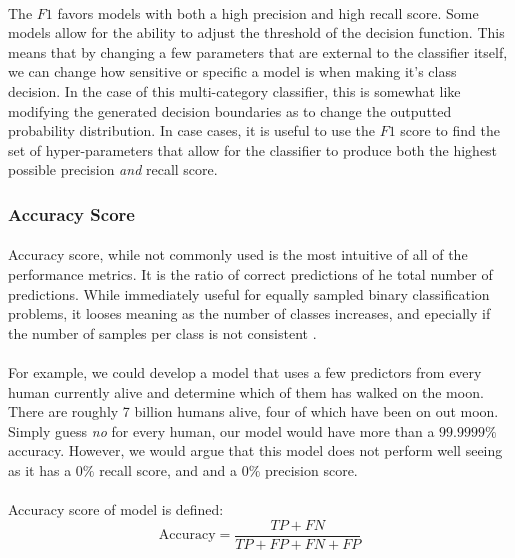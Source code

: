 \documentclass[12pt,letterpaper]{article}
\begin{document}
\paragraph*{}The $F1$ favors models with both a high precision and high recall score. Some models allow for the ability to adjust the threshold of the decision function. This means that by changing a few parameters that are external to the classifier itself, we can change how sensitive or specific a model is when making it's class decision. In the case of this multi-category classifier, this is somewhat like modifying the generated decision boundaries as to change the outputted probability distribution. In case cases, it is useful to use the $F1$ score to find the set of hyper-parameters that allow for the classifier to produce both the highest possible precision \textit{and} recall score.


\subsubsection{Accuracy Score}

\paragraph*{}Accuracy score, while not commonly used is the most intuitive of all of the performance metrics. It is the ratio of correct predictions of he total number of predictions. While immediately useful for equally sampled binary classification problems, it looses meaning as the number of classes increases, and epecially if the number of samples per class is not consistent \cite{Geron}.

\paragraph*{}For example, we could develop a model that uses a few predictors from every human currently alive and determine which of them has walked on the moon. There are roughly 7 billion humans alive, four of which have been on out moon. Simply guess \textit{no} for every human, our model would have more than a $99.9999\%$ accuracy. However, we would argue that this model does not perform well seeing as it has a $0 \%$ recall score, and and a $0 \%$ precision score.

\paragraph*{}Accuracy score of model is defined:
\begin{equation}
\label{eqn-BinaryAccuracy}
\text{Accuracy} = \frac{TP + FN}{TP + FP + FN + FP}
\end{equation}
\end{document}
